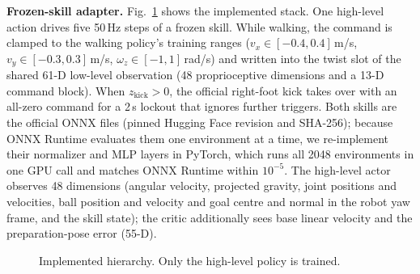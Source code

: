 \documentclass[10pt,twocolumn,letterpaper]{article}
\newcommand{\new}[1]{{\color{blue}#1}}
\begin{document}
{\color{blue}\textbf{Frozen-skill adapter.} Fig.~\ref{fig:arch} shows the implemented stack. One high-level action drives five 50\,Hz steps of a frozen skill. While walking, the command is clamped to the walking policy's training ranges ($v_x\in[-0.4,0.4]$\,m/s, $v_y\in[-0.3,0.3]$\,m/s, $\omega_z\in[-1,1]$\,rad/s) and written into the twist slot of the shared 61-D low-level observation (48 proprioceptive dimensions and a 13-D command block). When $z_{\mathrm{kick}}>0$, the official right-foot kick takes over with an all-zero command for a 2\,s lockout that ignores further triggers. Both skills are the official ONNX files (pinned Hugging Face revision and SHA-256); because ONNX Runtime evaluates them one environment at a time, we re-implement their normalizer and MLP layers in PyTorch, which runs all 2048 environments in one GPU call and matches ONNX Runtime within $10^{-5}$. The high-level actor observes 48 dimensions (angular velocity, projected gravity, joint positions and velocities, ball position and velocity and goal centre and normal in the robot yaw frame, and the skill state); the critic additionally sees base linear velocity and the preparation-pose error (55-D).\par}

\begin{figure}[t]
\centering
\color{blue}
\caption{\new{Implemented hierarchy. Only the high-level policy is trained.}}
\label{fig:arch}
\end{figure}
\end{document}
